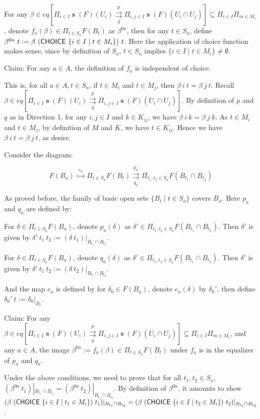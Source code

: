 \documentclass[a4paper]{article}
\DeclareMathOperator{\s}{\mathbf s}
\DeclareMathOperator{\CHOICE}{\sf CHOICE}
\begin{document}
For any $\beta\in eq[\Pi_{i\in I}\s(F)(U_i)\overset{p}{\underset{q}\rightrightarrows}\Pi_{i,j\in I}\s(F)(U_i\cap U_j)]\subseteq \Pi_{i\in I}\Pi_{m\in M_i}$, denote $f_a(\beta)\in \Pi_{t\in S_a}F(B_t)$ as $\beta^{0a}$, then for any $t\in S_a$, define $\beta^{0a} \ t := \beta \ (\CHOICE \ \{i\in I\mid t\in M_i\}) \ t$. Here the application of choice function makes sense, since by definition of $S_a$, $t\in S_a$ implies $\{i\in I\mid t\in M_i\}\ne\emptyset$.

Claim: For any $a\in A$, the definition of $f_a$ is independent of choice.

This is, for all $a\in A, t\in S_a$, if $t\in M_i$ and $t\in M_j$, then $\beta \ i \ t = \beta \ j \ t$. Recall $\beta \in eq[\Pi_{i\in I}\s(F)(U_i)\overset{p}{\underset{q}\rightrightarrows}\Pi_{i,j\in I}\s(F)(U_i\cap U_j)]$. By definition of $p$ and $q$ as in Direction 1, for any $i,j\in I$ and $k\in K_{ij}$, we have $\beta\ i \ k = \beta \ j \ k$. As $t\in M_i$ and $t\in M_j$, by definition of $M$ and $K$, we have $t\in K_{ij}$. Hence we have $\beta \ i \ t = \beta\ j \  t$, as desire.

Consider the diagram:

\[F(B_a)\overset{e_a}\rightarrowtail\Pi_{t\in S_a}F(B_t)\overset{p_a}{\underset{q_a}\rightrightarrows}\Pi_{t_1,t_2\in S_a}F(B_{t_1}\cap B_{t_2})\]

As proved before, the family of basic open sets $\{B_t\mid t\in S_a\}$ covers $B_a$. Here $p_a$ and $q_a$ are defined by:

For $\delta\in \Pi_{t\in S_a}F(B_a)$, denote $p_a(\delta)$ as $\delta'\in \Pi_{t_1,t_2\in S_a}F(B_{t_1}\cap B_{t_2})$. Then $\delta'$ is given by $\delta' \ t_1 \ t_2 :=(\delta \ t_1)|_{B_{t_1}\cap B_{t_2}}$. 

For $\delta\in \Pi_{t\in S_a}F(B_a)$, denote $q_a(\delta)$ as $\delta'\in \Pi_{t_1,t_2\in S_a}F(B_{t_1}\cap B_{t_2})$. Then $\delta'$ is given by $\delta' \ t_1 \ t_2 :=(\delta \ t_2)|_{B_{t_1}\cap B_{t_2}}$. 

And the map $e_a$ is defined by for $\delta_0\in F(B_a)$, denote $e_a(\delta)$ by $\delta_0'$, then define $\delta_0' \ t:=\delta_0|_{B_t}$.

Claim: For any $\beta\in eq[\Pi_{i\in I}\s(F)(U_i)\overset{p}{\underset{q}\rightrightarrows}\Pi_{i,j\in I}\s(F)(U_i\cap U_j)]\subseteq \Pi_{i\in I}\Pi_{m\in M_i}$, and any $a\in A$, the image $\beta^{0a}:=f_a(\beta)\in \Pi_{t\in S_a}F(B_t)$ under $f_a$ is in the equalizer of $p_a$ and $q_a$.

Under the above conditions, we need to prove that for all $t_1,t_2\in S_a$, $(\beta^{0a}\ t_1)|_{B_{t_1}\cap B_{t_2}}=(\beta^{0a} \ t_2)|_{B_{t_1}\cap B_{t_2}}$. By definition of $\beta^{0a}$, it amounts to show $(\beta\ (\CHOICE \ \{i\in I\mid t_1\in M_i\}) \ t_1)|_{B_{t_1}\cap B_{t_2}}=(\beta \ (\CHOICE \ \{i\in I\mid t_2\in M_i\}) \ t_2)|_{B_{t_1}\cap B_{t_2}}$.
\end{document}
